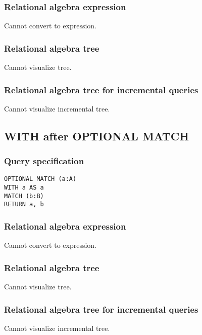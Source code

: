 \subsubsection*{Relational algebra expression}

Cannot convert to expression.

\subsubsection*{Relational algebra tree}

Cannot visualize tree.

\subsubsection*{Relational algebra tree for incremental queries}

Cannot visualize incremental tree.

\subsection{WITH after OPTIONAL MATCH}

\subsubsection*{Query specification}

\begin{lstlisting}
OPTIONAL MATCH (a:A)
WITH a AS a
MATCH (b:B)
RETURN a, b
\end{lstlisting}

\subsubsection*{Relational algebra expression}

Cannot convert to expression.

\subsubsection*{Relational algebra tree}

Cannot visualize tree.

\subsubsection*{Relational algebra tree for incremental queries}

Cannot visualize incremental tree.

